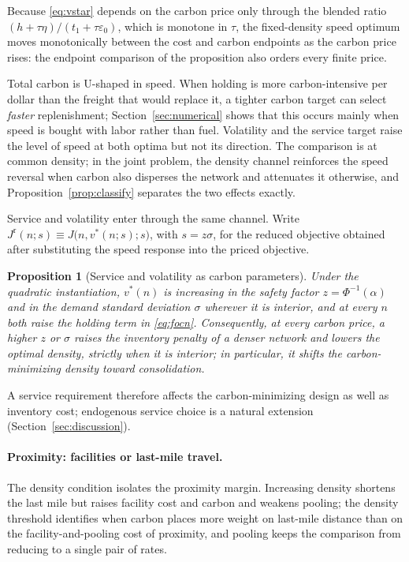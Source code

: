 \documentclass[11pt]{article}
\newtheorem{proposition}{Proposition}
\theoremstyle{definition}
\theoremstyle{remark}
\theoremstyle{plain}
\begin{document}
\noindent Because \eqref{eq:vstar} depends on the carbon price only through the blended ratio
$(h+\tau\eta)/(t_1+\tau\varepsilon_0)$, which is monotone in $\tau$, the fixed-density speed optimum moves
monotonically between the cost and carbon endpoints as the carbon price rises: the endpoint comparison of the
proposition also orders every finite price.

\noindent Total carbon is U-shaped in speed. When holding is more carbon-intensive per dollar than the freight
that would replace it, a tighter carbon target can select \emph{faster} replenishment;
Section~\ref{sec:numerical} shows that this occurs mainly when speed is bought with labor rather than fuel.
Volatility and the service target raise the level of speed at both optima but not its direction. The comparison is at common density; in the joint problem, the density channel reinforces the
speed reversal when carbon also disperses the network and attenuates it otherwise, and
Proposition~\ref{prop:classify} separates the two effects exactly.

Service and volatility enter through the same channel. Write
$J^{\mathrm r}(n;s)\equiv J\big(n,v^*(n;s);s\big)$, with $s=z\sigma$, for the reduced objective obtained after
substituting the speed response into the priced objective.

\begin{proposition}[Service and volatility as carbon parameters]\label{prop:service}
Under the quadratic instantiation, $v^*(n)$ is increasing in the safety factor $z=\Phi^{-1}(\alpha)$ and in
the demand standard deviation $\sigma$ wherever it is interior, and at every $n$ both raise the holding term in
\eqref{eq:focn}. Consequently, at every carbon price, a higher
$z$ or $\sigma$ raises the inventory penalty of a denser network and lowers the optimal density, strictly when
it is interior; in particular, it shifts the carbon-minimizing density toward consolidation.
\end{proposition}

\noindent A service requirement therefore affects the carbon-minimizing design as well as inventory cost;
endogenous service choice is a natural extension (Section~\ref{sec:discussion}).

\paragraph{Proximity: facilities or last-mile travel.} The density condition isolates the proximity
margin. Increasing density shortens the last mile but raises facility cost and carbon and weakens pooling;
the density threshold identifies when carbon places more weight on last-mile distance than on the
facility-and-pooling cost of proximity, and pooling keeps the comparison from reducing to a single pair of
rates.
\end{document}
